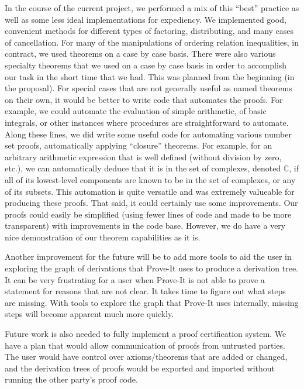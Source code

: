\documentclass{article}[12pt]
\begin{document}
In the course of the current project, we performed a mix of this ``best'' practice as well as some less ideal implementations for expediency.  We implemented good, convenient methods for different types of factoring, distributing, and many cases of cancellation.  For many of the manipulations of ordering relation inequalities, in contract, we used theorems on a case by case basis.  There were also various specialty theorems that we used on a case by case basis in order to accomplish our task in the short time that we had.  This was planned from the beginning (in the proposal).  For special cases that are not generally useful as named theorems on their own, it would be better to write code that automates the proofs.  For example, we could automate the evaluation of simple arithmetic, of basic integrals, or other instances where procedures are straightforward to automate.  Along these lines, we did write some useful code for automating various number set proofs, automatically applying ``closure'' theorems.  For example, for an arbitrary arithmetic expression that is well defined (without division by zero, etc.), we can automatically deduce that it is in the set of complexes, denoted $\mathbb{C}$, if all of its lowest-level components are known to be in the set of complexes, or any of its subsets.  This automation is quite versatile and was extremely valueable for producing these proofs.  That said, it could certainly use some improvements.  Our proofs could easily be simplified (using fewer lines of code and made to be more transparent) with improvements in the code base.  However, we do have a very nice demonstration of our theorem capabilities as it is.

Another improvement for the future will be to add more tools to aid the user in exploring the graph of derivations that Prove-It uses to produce a derivation tree.  It can be very frustrating for a user when Prove-It is not able to prove a statement for reasons that are not clear.  It takes time to figure out what steps are missing.  With tools to explore the graph that Prove-It uses internally, missing steps will become apparent much more quickly.

Future work is also needed to fully implement a proof certification system.  We have a plan that would allow communication of proofs from untrusted parties.  The user would have control over axioms/theorems that are added or changed, and the derivation trees of proofs would be exported and imported without running the other party's proof code.
\end{document}
